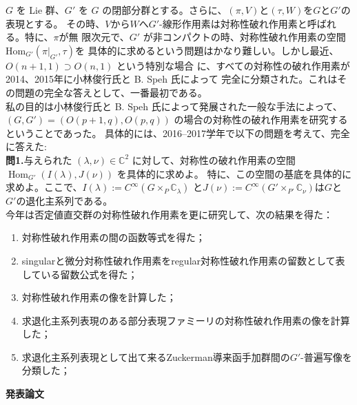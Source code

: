 \documentclass[a4j,twocolumn]{jarticle}
\begin{document}
\vspace{0.1cm}
$G$ を Lie 群、$G'$ を $G$ の閉部分群とする。さらに、$(\pi,V)$と$(\tau,W)$を$G$と$G'$の表現とする。
その時、$V$から$W$へ$G'$-線形作用素は対称性破れ作用素と呼ばれる。特に、$\pi$が無
限次元で、$G'$ が非コンパクトの時、対称性破れ作用素の空間$\mbox{Hom}_{G'}(\pi\big|_{G'},\tau)$を
具体的に求めるという問題はかなり難しい。しかし最近、$O(n + 1, 1) \supset O(n, 1)$ という特別な場合
に、すべての対称性の破れ作用素が2014、2015年に小林俊行氏と B. Speh 氏によって
完全に分類された。これはその問題の完全な答えとして、一番最初である。\\
私の目的は小林俊行氏と B. Speh 氏によって発展された一般な手法によって、$(G, G') = (O(p+1,q),O(p,q))$
の場合の対称性の破れ作用素を研究するということであった。
具体的には、2016--2017学年で以下の問題を考えて、完全に答えた:\\
{\noindent}\textbf{問\textbf{1}.}{与えられた $( \lambda, \nu) \in
\mathbb{C}^2$
に対して、対称性の破れ作用素の空間 $\operatorname{Hom}_{G'}(I(\lambda),J(\nu))$ を具体的に求めよ。
特に、この空間の基底を具体的に求めよ。ここで、$I(\lambda):=C^{\infty}\left(  G\times_P\mathbb{C}_\lambda\right)$
と$J(\nu):=C^{\infty}\left( G'\times_{P'}\mathbb{C}_{\nu} \right)$は$G$と
$G'$の退化主系列である。}\\
今年は否定値直交群の対称性破れ作用素を更に研究して、次の結果を得た：
\begin{enumerate}
	\item 対称性破れ作用素の間の函数等式を得た；
	\item singularと微分対称性破れ作用素をregular対称性破れ作用素の留数として表している留数公式を得た；
	\item 対称性破れ作用素の像を計算した；
	\item 求退化主系列表現のある部分表現ファミーリの対称性破れ作用素の像を計算した；
	\item 求退化主系列表現として出て来るZuckerman導来函手加群間の$G'$-普遍写像を分類した；
\end{enumerate}

\vspace{0.2cm}
\noindent
{\bf 発表論文}
\end{document}
